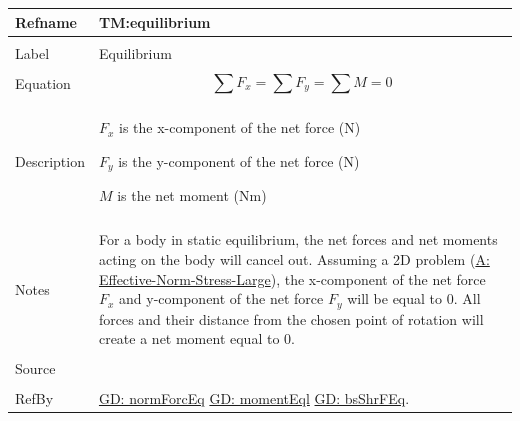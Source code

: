\documentclass[12pt]{article}
\begin{document}
\noindent \begin{minipage}{\textwidth}
\begin{tabular}{p{} p{}}
\toprule \textbf{Refname} & \textbf{TM:equilibrium}
\label{TM:equilibrium}
\\ \midrule \\
Label & Equilibrium
\\ \midrule \\
Equation & \begin{displaymath}
           \displaystyle\sum{{F_{x}}}=\displaystyle\sum{{F_{y}}}=\displaystyle\sum{M}=0
           \end{displaymath}
\\ \midrule \\
Description & \begin{symbDescription}
              \item{${F_{x}}$ is the x-component of the net force (N)}
              \item{${F_{y}}$ is the y-component of the net force (N)}
              \item{$M$ is the net moment (Nm)}
              \end{symbDescription}
\\ \midrule \\
Notes & For a body in static equilibrium, the net forces and net moments acting on the body will cancel out. Assuming a 2D problem (\hyperref[assumpENSL]{A: Effective-Norm-Stress-Large}), the x-component of the net force ${F_{x}}$ and y-component of the net force ${F_{y}}$ will be equal to $0$. All forces and their distance from the chosen point of rotation will create a net moment equal to $0$.
\\ \midrule \\
Source & \cite{fredlund1977}
\\ \midrule \\
RefBy & \hyperref[GD:normForcEq]{GD: normForcEq} \hyperref[GD:momentEql]{GD: momentEql} \hyperref[GD:bsShrFEq]{GD: bsShrFEq}.
\\ \bottomrule \end{tabular}
\end{minipage}
\par~
\end{document}
